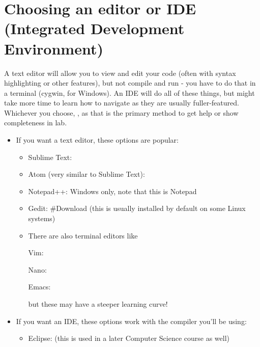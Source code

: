 \documentclass[letterpaper,10pt,english]{sphinxmanual}
\begin{document}
\section{Choosing an editor or IDE (Integrated Development Environment)}
\label{\detokenize{lecture_notes/setting_up_for_ds:choosing-an-editor-or-ide-integrated-development-environment}}
A text editor will allow you to view and edit your code (often with
syntax highlighting or other features), but not compile and run - you
have to do that in a terminal (cygwin, for Windows). An IDE will do
all of these things, but might take more time to learn how to navigate
as they are usually fuller-featured. Whichever you choose, ,
as that is the primary method to get help or show completeness in lab.
\begin{itemize}
\item {} 
If you want a text editor, these options are popular:
\begin{itemize}
\item {} 
Sublime Text: 

\item {} 
Atom (very similar to Sublime Text): 

\item {} 
Notepad++: 
Windows only, note that this is  Notepad

\item {} 
Gedit: \#Download
(this is usually installed by default on some Linux systems)

\item {} 
There are also terminal editors like

Vim: 

Nano: 

Emacs: 

but these may have a steeper learning curve!

\end{itemize}

\item {} 
If you want an IDE, these options work with the compiler you’ll be
using:
\begin{itemize}
\item {} 
Eclipse: 
(this is used in a later Computer Science course as well)


\end{itemize}
\end{itemize}
\end{document}
